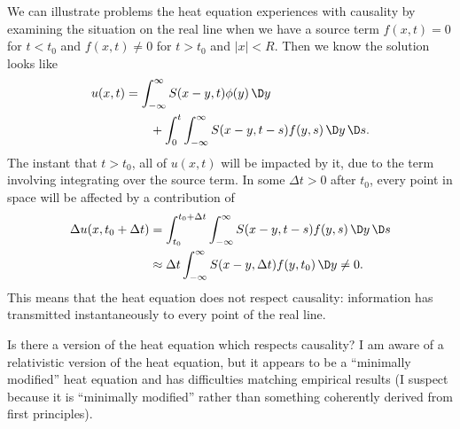 \begin{node}[Causality]\label{pde:heat-000P}%
We can illustrate problems the heat equation experiences with causality
by examining the situation on the real line
when we have a source term $f(x,t)=0$ for $t<t_{0}$ and $f(x,t)\neq0$
for $t>t_{0}$ and $|x|<R$. Then we know the solution 
looks like
\begin{equation*}
\begin{split}
u(x,t) &=\int^{\infty}_{-\infty}S(x-y,t)\phi(y)\,\D y\\
&\qquad+\int^{t}_{0}\int^{\infty}_{-\infty}S(x-y,t-s)f(y,s)\,\D y\,\D s.
\end{split}
\end{equation*}
The instant that $t>t_{0}$, all of $u(x,t)$ will be impacted by it, due
to the term involving integrating over the source term. In some $\Delta t>0$
after $t_{0}$, every point in space will be affected by a contribution of
\begin{equation*}
\begin{split}
\Delta u(x,t_{0}+\Delta t)
&=\int^{t_{0}+\Delta t}_{t_{0}}\int^{\infty}_{-\infty}S(x-y,t-s)f(y,s)\,\D y\,\D s\\
&\approx\Delta t\int^{\infty}_{-\infty}S(x-y,\Delta t)f(y,t_{0})\,\D y\neq0.
\end{split}
\end{equation*}
This means that the heat equation does not respect causality:
information has transmitted instantaneously to every point of the real
line.
\end{node}

\begin{puzzle}
Is there a version of the heat equation which respects causality? I am
aware of a relativistic version of the heat equation, but it appears to
be a ``minimally modified'' heat equation and has difficulties matching
empirical results (I suspect because it is ``minimally modified'' rather
than something coherently derived from first principles).
\end{puzzle}

